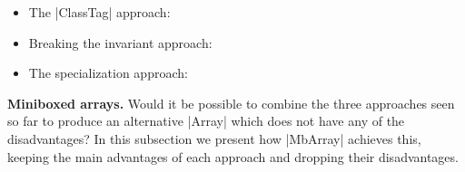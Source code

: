 \vspace{-1em}
\begin{itemize}
  \item The |ClassTag| approach:
  \item Breaking the invariant approach:
  \item The specialization approach:
\end{itemize}
\vspace{-1em}

\textbf{Miniboxed arrays.} Would it be possible to combine the three approaches seen so far to produce an alternative |Array| which does not have any of the disadvantages? In this subsection we present how |MbArray| achieves this, keeping the main advantages of each approach and dropping their disadvantages.



